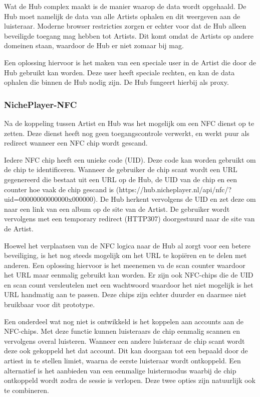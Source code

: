Wat de Hub complex maakt is de manier waarop de data wordt opgehaald. De Hub moet namelijk de data van alle Artists ophalen en dit weergeven aan de luisteraar. Moderne browser restricties zorgen er echter voor dat de Hub alleen beveiligde toegang mag hebben tot Artists. Dit komt omdat de Artists op andere domeinen staan, waardoor de Hub er niet zomaar bij mag.

Een oplossing hiervoor is het maken van een speciale user in de Artist die door de Hub gebruikt kan worden. Deze user heeft speciale rechten, en kan de data ophalen die binnen de Hub nodig zijn. De Hub fungeert hierbij als proxy.

\subsubsection*{NichePlayer-NFC}
Na de koppeling tussen Artist en Hub was het mogelijk om een NFC dienst op te zetten. Deze dienst heeft nog geen toegangscontrole verwerkt, en werkt puur als redirect wanneer een NFC chip wordt gescand.

Iedere NFC chip heeft een unieke code (UID). Deze code kan worden gebruikt om de chip te identificeren. Wanneer de gebruiker de chip scant wordt een URL gegenereerd die bestaat uit een URL op de Hub, de UID van de chip en een counter hoe vaak de chip gescand is (https://hub.nicheplayer.nl/api/nfc/?uid=00000000000000x000000). De Hub herkent vervolgens de UID en zet deze om naar een link van een album op de site van de Artist. De gebruiker wordt vervolgens met een temporary redirect (HTTP307) doorgestuurd naar de site van de Artist.

Hoewel het verplaatsen van de NFC logica naar de Hub al zorgt voor een betere beveiliging, is het nog steeds mogelijk om het URL te kopiëren en te delen met anderen. Een oplossing hiervoor is het meenemen va de scan counter waardoor het URL maar eenmalig gebruikt kan worden. Er zijn ook NFC-chips die de UID en scan count versleutelen met een wachtwoord waardoor het niet mogelijk is het URL handmatig aan te passen. Deze chips zijn echter duurder en daarmee niet bruikbaar voor dit prototype.

Een onderdeel wat nog niet is ontwikkeld is het koppelen aan accounts aan de NFC-chips. Met deze functie kunnen luisteraars de chip eenmalig scannen en vervolgens overal luisteren. Wanneer een andere luisteraar de chip scant wordt deze ook gekoppeld het dat account. Dit kan doorgaan tot een bepaald door de artiest in te stellen limiet, waarna de eerste luisteraar wordt ontkoppeld. Een alternatief is het aanbieden van een eenmalige luistermodus waarbij de chip ontkoppeld wordt zodra de sessie is verlopen. Deze twee opties zijn natuurlijk ook te combineren.

